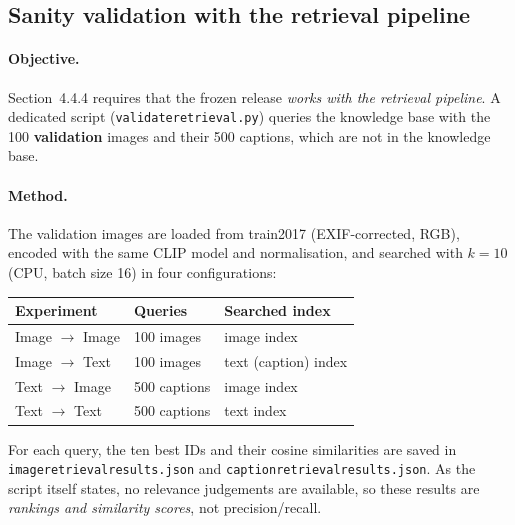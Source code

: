 \documentclass[11pt,a4paper]{article}
\renewcommand{\_}{\textunderscore\allowbreak{}}
\newcommand{\code}[1]{\texttt{#1}}
\begin{document}
\subsection{Sanity validation with the retrieval pipeline}
\label{sec:retrieval}

\paragraph{Objective.} Section~4.4.4 requires that the frozen release \emph{works with the retrieval pipeline}. A dedicated script (\code{validate\_retrieval.py}) queries the knowledge base with the 100 \textbf{validation} images and their 500 captions, which are not in the knowledge base.

\paragraph{Method.} The validation images are loaded from train2017 (EXIF-corrected, RGB), encoded with the same CLIP model and normalisation, and searched with $k=10$ (CPU, batch size 16) in four configurations:
\begin{center}
\small
\begin{tabular}{@{}lll@{}}
\toprule
\textbf{Experiment} & \textbf{Queries} & \textbf{Searched index}\\
\midrule
Image $\to$ Image & 100 images & image index\\
Image $\to$ Text & 100 images & text (caption) index\\
Text $\to$ Image & 500 captions & image index\\
Text $\to$ Text & 500 captions & text index\\
\bottomrule
\end{tabular}
\end{center}
For each query, the ten best IDs and their cosine similarities are saved in \code{image\_retrieval\_results.json} and \code{caption\_retrieval\_results.json}. As the script itself states, no relevance judgements are available, so these results are \emph{rankings and similarity scores}, not precision/recall.
\end{document}
